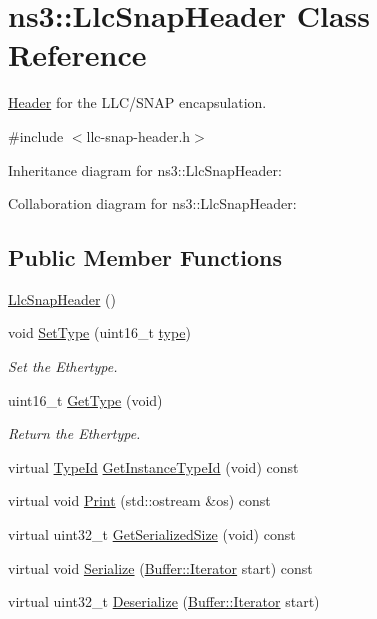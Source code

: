 \hypertarget{classns3_1_1LlcSnapHeader}{}\section{ns3\+:\+:Llc\+Snap\+Header Class Reference}
\label{classns3_1_1LlcSnapHeader}


\hyperlink{classns3_1_1Header}{Header} for the L\+L\+C/\+S\+N\+AP encapsulation.  




{\ttfamily \#include $<$llc-\/snap-\/header.\+h$>$}



Inheritance diagram for ns3\+:\+:Llc\+Snap\+Header\+:


Collaboration diagram for ns3\+:\+:Llc\+Snap\+Header\+:
\subsection*{Public Member Functions}
\begin{DoxyCompactItemize}
\item 
\hyperlink{classns3_1_1LlcSnapHeader_adc3a72c9b120896a43507a75ed48f88a}{Llc\+Snap\+Header} ()
\item 
void \hyperlink{classns3_1_1LlcSnapHeader_ad11362908897df050361a0c70ce454fc}{Set\+Type} (uint16\+\_\+t \hyperlink{visualizer-ideas_8txt_add98db9e15e2a58cf2b57623e7aa893a}{type})
\begin{DoxyCompactList}\small\item\em Set the Ethertype. \end{DoxyCompactList}\item 
uint16\+\_\+t \hyperlink{classns3_1_1LlcSnapHeader_a6779dfaf79e62d11658c303611fcc8b7}{Get\+Type} (void)
\begin{DoxyCompactList}\small\item\em Return the Ethertype. \end{DoxyCompactList}\item 
virtual \hyperlink{classns3_1_1TypeId}{Type\+Id} \hyperlink{classns3_1_1LlcSnapHeader_a514dae8d5cd7be4563464512e935ff80}{Get\+Instance\+Type\+Id} (void) const 
\item 
virtual void \hyperlink{classns3_1_1LlcSnapHeader_a85adf83d46fa58dd0c90496adcd205f4}{Print} (std\+::ostream \&os) const 
\item 
virtual uint32\+\_\+t \hyperlink{classns3_1_1LlcSnapHeader_ab71ac1dee8d8f9eb9d1b6d395e6b14ee}{Get\+Serialized\+Size} (void) const 
\item 
virtual void \hyperlink{classns3_1_1LlcSnapHeader_a1ca9b57a793366cc9b660cd8c2d213aa}{Serialize} (\hyperlink{classns3_1_1Buffer_1_1Iterator}{Buffer\+::\+Iterator} start) const 
\item 
virtual uint32\+\_\+t \hyperlink{classns3_1_1LlcSnapHeader_aa6bc7fc07a1d9948c624cb30ad2ff82d}{Deserialize} (\hyperlink{classns3_1_1Buffer_1_1Iterator}{Buffer\+::\+Iterator} start)
\end{DoxyCompactItemize}
